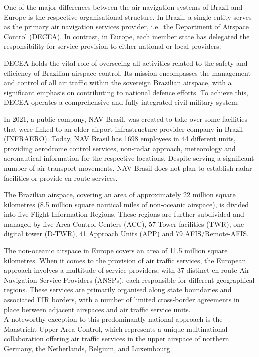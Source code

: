 \documentclass[
  a4paper,
  DIV=11,
  numbers=noendperiod]{scrreport}
\begin{document}
One of the major differences between the air navigation systems of
Brazil and Europe is the respective organisational structure. In Brazil,
a single entity serves as the primary air navigation services provider,
i.e.~the Department of Airspace Control (DECEA). In contrast, in Europe,
each member state has delegated the responsibility for service provision
to either national or local providers.

DECEA holds the vital role of overseeing all activities related to the
safety and efficiency of Brazilian airspace control. Its mission
encompasses the management and control of all air traffic within the
sovereign Brazilian airspace, with a significant emphasis on
contributing to national defence efforts. To achieve this, DECEA
operates a comprehensive and fully integrated civil-military system.

In 2021, a public company, NAV Brasil, was created to take over some
facilities that were linked to an older airport infrastructure provider
company in Brazil (INFRAERO). Today, NAV Brasil has 1698 employees in 44
different units, providing aerodrome control services, non-radar
approach, meteorology and aeronautical information for the respective
locations. Despite serving a significant number of air transport
movements, NAV Brasil does not plan to establish radar facilities or
provide en-route services.

The Brazilian airspace, covering an area of approximately 22 million
square kilometres (8.5 million square nautical miles of non-oceanic
airspace), is divided into five Flight Information Regions. These
regions are further subdivided and managed by five Area Control Centers
(ACC), 57 Tower facilities (TWR), one digital tower (D-TWR), 41 Approach
Units (APP) and 79 AFIS/Remote-AFIS.

The non-oceanic airspace in Europe covers an area of 11.5 million square
kilometres. When it comes to the provision of air traffic services, the
European approach involves a multitude of service providers, with 37
distinct en-route Air Navigation Service Providers (ANSPs), each
responsible for different geographical regions. These services are
primarily organised along state boundaries and associated FIR borders,
with a number of limited cross-border agreements in place between
adjacent airspaces and air traffic service units.\\
A noteworthy exception to this predominantly national approach is the
Maastricht Upper Area Control, which represents a unique multinational
collaboration offering air traffic services in the upper airspace of
northern Germany, the Netherlands, Belgium, and Luxembourg.
\end{document}
